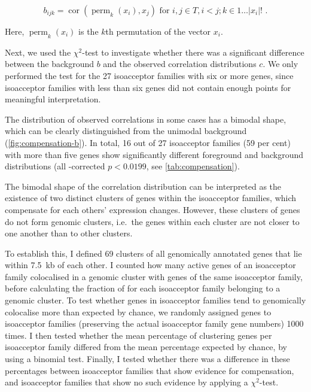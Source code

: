 \begin{equation}
    b_{ijk} = \operatorname{cor}(\operatorname{perm}_k(x_i), x_j)
        \text{\ for \(i, j \in T, i < j; k \in 1\dots\lvert x_i\rvert!\)\ .}
\end{equation}

Here, \(\operatorname{perm}_k(x_i)\) is the \(k\)th permutation of the vector
\(x_i\).

Next, we used the \(\chi^2\)-test to investigate whether there was a significant
difference between the background \(b\) and the observed correlation
distributions \(c\). We only performed the test for the \num{27} isoacceptor
families with six or more genes, since isoacceptor families with less than six
genes did not contain enough points for meaningful interpretation.

The distribution of observed correlations in some cases has a bimodal shape,
which can be clearly distinguished from the unimodal background
(\cref{fig:compensation-b}). In total, \num{16} out of \num{27} isoacceptor
families (\num{59} per cent) with more than five genes show significantly
different foreground and background distributions (all \fdr-corrected \(p <
0.0199\), see \cref{tab:compensation}).

The bimodal shape of the correlation distribution can be interpreted as the
existence of two distinct clusters of \trna genes within the isoacceptor
families, which compensate for each others’ expression changes. However, these
clusters of genes do not form genomic clusters, i.e.\ the \trna genes within
each cluster are not closer to one another than to other clusters.

To establish this, I defined \num{69} clusters of all genomically annotated
\trna genes that lie within \SI{7.5}{kb} of each other. I counted how many
active \trna genes of an isoacceptor family colocalised in a genomic cluster
with \trna genes of the same isoacceptor family, before calculating the fraction
of \trna for each isoacceptor family belonging to a genomic cluster. To test
whether genes in isoacceptor families tend to genomically colocalise more than
expected by chance, we randomly assigned \trna genes to isoacceptor families
(preserving the actual isoacceptor family gene numbers) \num{1000} times. I then
tested whether the mean percentage of clustering \trna genes per isoacceptor
family differed from the mean percentage expected by chance, by using a binomial
test. Finally, I tested whether there was a difference in these percentages
between isoacceptor families that show evidence for compensation, and
isoacceptor families that show no such evidence by applying a \(\chi^2\)-test.

